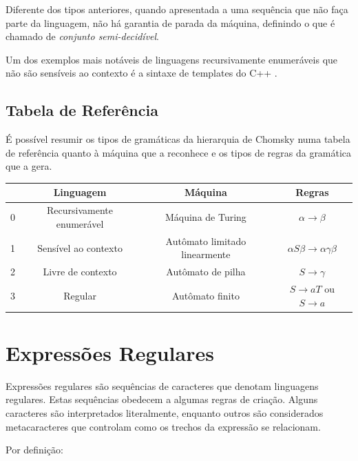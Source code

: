 \documentclass[a4paper,12pt,oneside,onecolumn]{uerj}
\begin{document}
Diferente dos tipos anteriores, quando apresentada a uma sequência que não faça parte da linguagem, não há garantia de parada da máquina, definindo o que é chamado de \emph{conjunto semi-decidível}.

Um dos exemplos mais notáveis de linguagens recursivamente enumeráveis que não são sensíveis ao contexto é a sintaxe de templates do C++ \cite{bib:Veldhuizen03}.

\subsection{Tabela de Referência}

É possível resumir os tipos de gramáticas da hierarquia de Chomsky numa tabela de referência quanto à máquina que a reconhece e os tipos de regras da gramática que a gera.

\begin{center}
	\begin{tabular}{ c | c | c | c }
		 & {\bf Linguagem} & {\bf Máquina} & {\bf Regras} \\
		\hline 
		0 & Recursivamente enumerável & Máquina de Turing 			 & 
			$\alpha \rightarrow \beta$ \\ 
		1 & Sensível ao contexto 		& Autômato limitado linearmente & 
			$\alpha S\beta\rightarrow \alpha\gamma\beta$\\ 
		2 & Livre de contexto 			& Autômato de pilha 			 & 
			$S \rightarrow \gamma$\\ 
		3 & Regular 					& Autômato finito 				 &
			$S \rightarrow aT$ ou $S \rightarrow a$\\ 
	\end{tabular}
\end{center}

\section{Expressões Regulares}

Expressões regulares são sequências de caracteres que denotam linguagens regulares. Estas sequências obedecem a algumas regras de criação. Alguns caracteres são interpretados literalmente, enquanto outros são considerados metacaracteres que controlam como os trechos da expressão se relacionam.

Por definição:
\end{document}
